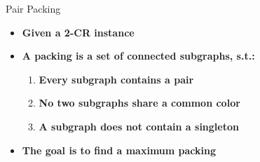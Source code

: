 \begin{frame}{Pair Packing}
\begin{itemize}
\item \textbf<1> 
{Given a 2-CR instance}

\item \textbf<2>
{A packing is a set of connected subgraphs, s.t.:}
	
	\begin{enumerate}
	
	\item \textbf<3> 
	{Every subgraph contains a pair}
	
	\item \textbf<4>
	{No two subgraphs share a common color} 

	\item \textbf<5>
	{A subgraph does not contain a singleton} 
	
	\end{enumerate} 

\item \textbf<6>
{The goal is to find a maximum packing}

\end{itemize}

\end{frame}